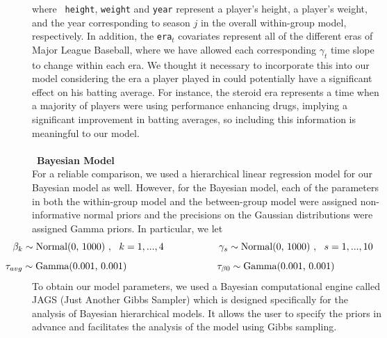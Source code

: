 \documentclass[10pt,a4paper]{article}
\begin{document}
where \ \texttt{height}, \texttt{weight} and \texttt{year} represent a player's height, a player's weight, and the year corresponding to season $j$ in the overall within-group model, respectively. In addition, the \texttt{era}$_t$ covariates represent all of the different eras of Major League Baseball, where we have allowed each corresponding $\gamma_t$ time slope to change within each era. We thought it necessary to incorporate this into our model considering the era a player played in could potentially have a significant effect on his batting average. For instance, the steroid era represents a time when a majority of players were using performance enhancing drugs, implying a significant improvement in batting averages, so including this information is meaningful to our model.\\
\\\
\textbf{\small Bayesian Model}\\
For a reliable comparison, we used a hierarchical linear regression model for our Bayesian model as well. However, for the Bayesian model, each of the parameters in both the within-group model and the between-group model were assigned non-informative normal priors and the precisions on the Gaussian distributions were assigned Gamma priors. In particular, we let \\ $$\hspace{-1cm}\beta_k \sim \textrm{Normal(0, 1000)} \ , \ \ k = 1,..., 4   \hspace{2cm}\gamma_s \sim \textrm{Normal(0, 1000)} \ , \ \ s = 1,..., 10$$ $$\hspace{-2.9cm} \ \ \tau_{avg} \sim \textrm{Gamma(0.001, 0.001)} \ \ \ \ \ \ \ \ \ \  \hspace{2.1cm}\tau_{\beta0} \sim \textrm{Gamma(0.001, 0.001)}$$
To obtain our model parameters, we used a Bayesian computational engine called JAGS (Just Another Gibbs Sampler) which is designed specifically for the analysis of Bayesian hierarchical models. It allows the user to specify the priors in advance and facilitates the analysis of the model using Gibbs sampling.
\end{document}
